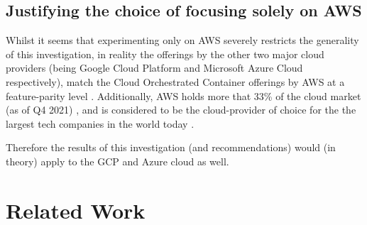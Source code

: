 \section{Justifying the choice of focusing solely on AWS}
Whilst it seems that experimenting only on AWS severely restricts the generality of this investigation, in reality the offerings by the other two major cloud providers
(being Google Cloud Platform and Microsoft Azure Cloud respectively), match the Cloud Orchestrated Container offerings by AWS at a feature-parity level \cite{contaier_workloads}.
Additionally, AWS holds more that 33\% of the cloud market (as of Q4 2021) \cite{aws_cloud_share},
and is considered to be the cloud-provider of choice for the the largest tech companies in the world today \cite{aws_users}.

Therefore the results of this investigation (and recommendations) would (in theory) apply to the GCP and Azure cloud as well.

\chapter{Related Work}